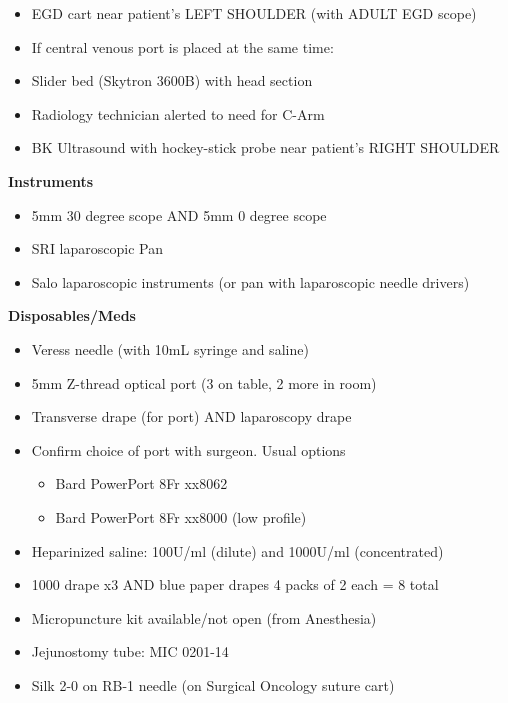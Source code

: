 \documentclass[
  letterpaper,
]{scrbook}
\providecommand{\tightlist}{%
  \setlength{\itemsep}{0pt}\setlength{\parskip}{0pt}}
\begin{document}
\begin{itemize}
\tightlist
\item
  EGD cart near patient's LEFT SHOULDER (with ADULT EGD scope)
\item
  If central venous port is placed at the same time:
\item
  Slider bed (Skytron 3600B) with head section
\item
  Radiology technician alerted to need for C-Arm
\item
  BK Ultrasound with hockey-stick probe near patient's RIGHT SHOULDER
\end{itemize}

\textbf{Instruments}

\begin{itemize}
\tightlist
\item
  5mm 30 degree scope AND 5mm 0 degree scope
\item
  SRI laparoscopic Pan
\item
  Salo laparoscopic instruments (or pan with laparoscopic needle
  drivers)
\end{itemize}

\textbf{Disposables/Meds}

\begin{itemize}
\tightlist
\item
  Veress needle (with 10mL syringe and saline)
\item
  5mm Z-thread optical port (3 on table, 2 more in room)
\item
  Transverse drape (for port) AND laparoscopy drape
\item
  Confirm choice of port with surgeon. Usual options

  \begin{itemize}
  \tightlist
  \item
    Bard PowerPort 8Fr xx8062
  \item
    Bard PowerPort 8Fr xx8000 (low profile)
  \end{itemize}
\item
  Heparinized saline: 100U/ml (dilute) and 1000U/ml (concentrated)
\item
  1000 drape x3 AND blue paper drapes 4 packs of 2 each = 8 total
\item
  Micropuncture kit available/not open (from Anesthesia)
\item
  Jejunostomy tube: MIC 0201-14
\item
  Silk 2-0 on RB-1 needle (on Surgical Oncology suture cart)
\end{itemize}
\end{document}
